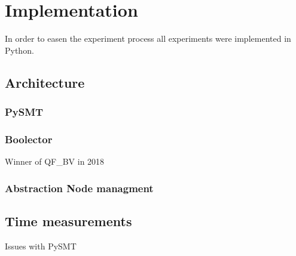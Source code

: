 \chapter{Implementation}
\label{ch:implementation}
In order to easen the experiment process all experiments were implemented in Python.
\section{Architecture}

\subsection{PySMT}
\label{sec:implementation:pysmt}

\subsection{Boolector}
\label{sec:implementation:boolector}
Winner of QF\_BV in 2018 

\subsection{Abstraction Node managment}

\section{Time measurements}
Issues with PySMT